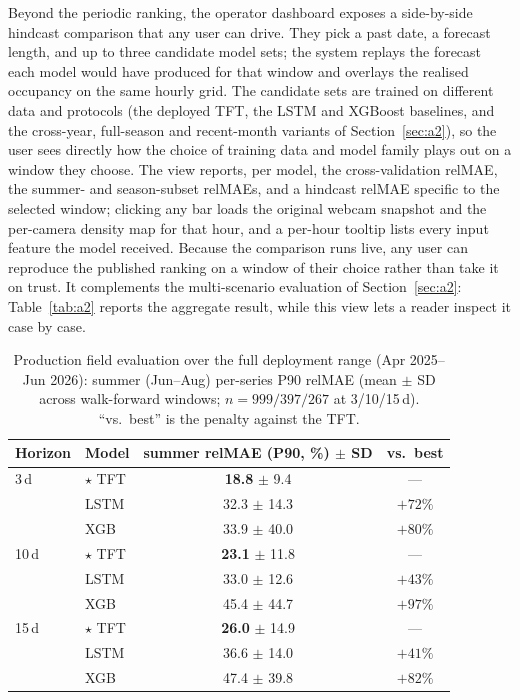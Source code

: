 \documentclass[twocolumn,twoside,a4paper,10pt]{IEEEtran}
\begin{document}
Beyond the periodic ranking, the operator dashboard exposes a side-by-side hindcast comparison that any user can drive. They pick a past date, a forecast length, and up to three candidate model sets; the system replays the forecast each model would have produced for that window and overlays the realised occupancy on the same hourly grid. The candidate sets are trained on different data and protocols (the deployed TFT, the LSTM and XGBoost baselines, and the cross-year, full-season and recent-month variants of Section~\ref{sec:a2}), so the user sees directly how the choice of training data and model family plays out on a window they choose. The view reports, per model, the cross-validation relMAE, the summer- and season-subset relMAEs, and a hindcast relMAE specific to the selected window; clicking any bar loads the original webcam snapshot and the per-camera density map for that hour, and a per-hour tooltip lists every input feature the model received. Because the comparison runs live, any user can reproduce the published ranking on a window of their choice rather than take it on trust. It complements the multi-scenario evaluation of Section~\ref{sec:a2}: Table~\ref{tab:a2} reports the aggregate result, while this view lets a reader inspect it case by case.

\begin{table}[!ht]
    \caption{Production field evaluation over the full deployment range (Apr 2025--Jun 2026): summer (Jun--Aug) per-series P90 relMAE (mean $\pm$ SD across walk-forward windows; $n=999/397/267$ at 3/10/15\,d). ``vs.\ best'' is the penalty against the TFT.}
    \label{tab:field_eval}
    \begin{center}
    \footnotesize
    \begin{tabular}{llcc}
        \toprule
        Horizon & Model & summer relMAE (P90, \%) $\pm$ SD & vs.\ best \\
        \midrule
         3\,d & $\star$ TFT  & \textbf{18.8} $\pm$ 9.4 & --- \\
              & LSTM         & 32.3 $\pm$ 14.3 & $+72\%$ \\
              & XGB          & 33.9 $\pm$ 40.0 & $+80\%$ \\
        \midrule
        10\,d & $\star$ TFT  & \textbf{23.1} $\pm$ 11.8 & --- \\
              & LSTM         & 33.0 $\pm$ 12.6 & $+43\%$ \\
              & XGB          & 45.4 $\pm$ 44.7 & $+97\%$ \\
        \midrule
        15\,d & $\star$ TFT  & \textbf{26.0} $\pm$ 14.9 & --- \\
              & LSTM         & 36.6 $\pm$ 14.0 & $+41\%$ \\
              & XGB          & 47.4 $\pm$ 39.8 & $+82\%$ \\
        \bottomrule
    \end{tabular}
    \end{center}
\end{table}
\end{document}
